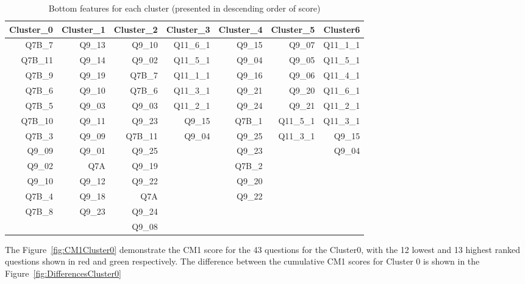 \documentclass{article}
\begin{document}
\begin{table}[htbp]
  \centering
  \caption{Bottom features for each cluster (presented in descending order of
  score)}
    \begin{tabular}{rrrrrrr}
    \toprule
    Cluster\_0 & Cluster\_1 & Cluster\_2 & Cluster\_3 & Cluster\_4 & Cluster\_5 & Cluster6 \\
    \midrule
    Q7B\_7 & Q9\_13 & Q9\_10 & Q11\_6\_1 & Q9\_15 & Q9\_07 & Q11\_1\_1 \\
    Q7B\_11 & Q9\_14 & Q9\_02 & Q11\_5\_1 & Q9\_04 & Q9\_05 & Q11\_5\_1 \\
    Q7B\_9 & Q9\_19 & Q7B\_7 & Q11\_1\_1 & Q9\_16 & Q9\_06 & Q11\_4\_1 \\
    Q7B\_6 & Q9\_10 & Q7B\_6 & Q11\_3\_1 & Q9\_21 & Q9\_20 & Q11\_6\_1 \\
    Q7B\_5 & Q9\_03 & Q9\_03 & Q11\_2\_1 & Q9\_24 & Q9\_21 & Q11\_2\_1 \\
    Q7B\_10 & Q9\_11 & Q9\_23 & Q9\_15 & Q7B\_1 & Q11\_5\_1 & Q11\_3\_1 \\
    Q7B\_3 & Q9\_09 & Q7B\_11 & Q9\_04 & Q9\_25 & Q11\_3\_1 & Q9\_15 \\
    Q9\_09 & Q9\_01 & Q9\_25 &       & Q9\_23 &       & Q9\_04 \\
    Q9\_02 & Q7A   & Q9\_19 &       & Q7B\_2 &       &  \\
    Q9\_10 & Q9\_12 & Q9\_22 &       & Q9\_20 &       &  \\
    Q7B\_4 & Q9\_18 & Q7A   &       & Q9\_22 &       &  \\
    Q7B\_8 & Q9\_23 & Q9\_24 &       &       &       &  \\
          &       & Q9\_08 &       &       &       &  \\
    \bottomrule
    \end{tabular}
  \label{tab:bottom}
\end{table}



The Figure~\ref{fig:CM1Cluster0} demonstrate the CM1 score for the 43
questions for the Cluster0, with the 12 lowest and 13 highest ranked
questions shown in red and green respectively. The difference between the
cumulative CM1 scores for Cluster 0 is shown in the
Figure~\ref{fig:DifferencesCluster0}
\end{document}
